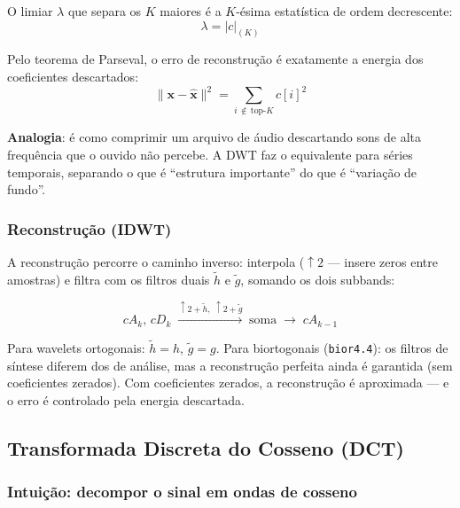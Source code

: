 \documentclass[12pt, a4paper]{article}
\begin{document}
O limiar $\lambda$ que separa os $K$ maiores é a $K$-ésima estatística de ordem decrescente:
\begin{equation}
    \lambda = |c|_{(K)}
\end{equation}

Pelo teorema de Parseval, o erro de reconstrução é exatamente a energia dos coeficientes descartados:
\begin{equation}
    \|\mathbf{x} - \hat{\mathbf{x}}\|^2
    = \sum_{i \,\notin\, \text{top-}K} c[i]^2
\end{equation}

\textbf{Analogia}: é como comprimir um arquivo de áudio descartando sons de alta frequência que o ouvido não percebe. A DWT faz o equivalente para séries temporais, separando o que é ``estrutura importante'' do que é ``variação de fundo''.

\subsubsection{Reconstrução (IDWT)}

A reconstrução percorre o caminho inverso: interpola (${\uparrow}2$ — insere zeros entre amostras) e filtra com os filtros duais $\tilde{h}$ e $\tilde{g}$, somando os dois subbands:

\begin{equation}
    cA_k,\, cD_k \;\xrightarrow{\uparrow 2 + \tilde{h},\;\uparrow 2 + \tilde{g}}\; \text{soma} \;\longrightarrow\; cA_{k-1}
\end{equation}

Para wavelets ortogonais: $\tilde{h} = h$, $\tilde{g} = g$. Para biortogonais (\texttt{bior4.4}): os filtros de síntese diferem dos de análise, mas a reconstrução perfeita ainda é garantida (sem coeficientes zerados). Com coeficientes zerados, a reconstrução é aproximada — e o erro é controlado pela energia descartada.

\subsection{Transformada Discreta do Cosseno (DCT)}

\subsubsection{Intuição: decompor o sinal em ondas de cosseno}
\end{document}
